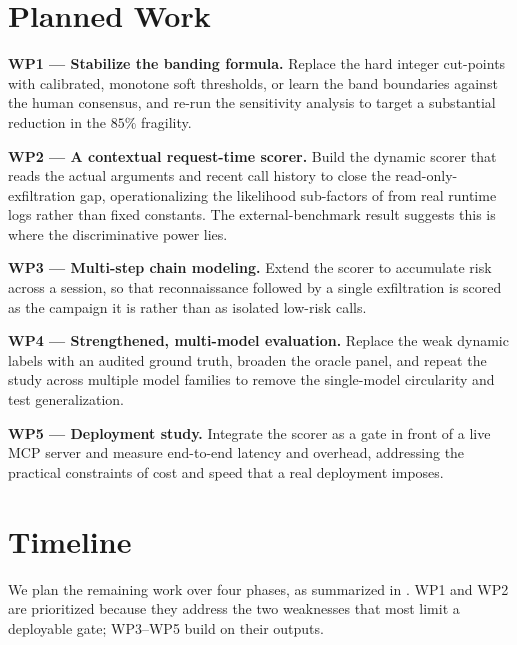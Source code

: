 \section{Planned Work}
\label{sec:plan:work}

\textbf{WP1 --- Stabilize the banding formula.} Replace the hard integer
cut-points with calibrated, monotone soft thresholds, or learn the band
boundaries against the human consensus, and re-run the sensitivity analysis to
target a substantial reduction in the $85\%$ fragility.

\textbf{WP2 --- A contextual request-time scorer.} Build the dynamic scorer that
reads the actual arguments and recent call history to close the
read-only-exfiltration gap, operationalizing the likelihood sub-factors of
 from real runtime logs rather than fixed constants.
The external-benchmark result suggests this is where the discriminative power
lies.

\textbf{WP3 --- Multi-step chain modeling.} Extend the scorer to accumulate risk
across a session, so that reconnaissance followed by a single exfiltration is
scored as the campaign it is rather than as isolated low-risk calls.

\textbf{WP4 --- Strengthened, multi-model evaluation.} Replace the weak dynamic
labels with an audited ground truth, broaden the oracle panel, and repeat the
study across multiple model families to remove the single-model circularity and
test generalization.

\textbf{WP5 --- Deployment study.} Integrate the scorer as a gate in front of a
live MCP server and measure end-to-end latency and overhead, addressing the
practical constraints of cost and speed that a real deployment imposes.

\section{Timeline}
\label{sec:plan:timeline}

We plan the remaining work over four phases, as summarized in
. WP1 and WP2 are prioritized because they address the two
weaknesses that most limit a deployable gate; WP3--WP5 build on their outputs.


